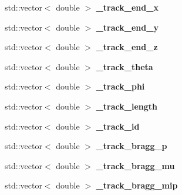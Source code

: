 \begin{DoxyCompactItemize}
\item 
\hypertarget{group__lee_ga78cb36dded5326c08cae77d5af6f3cd2}{std\-::vector$<$ double $>$ {\bfseries \-\_\-track\-\_\-end\-\_\-x}}\label{group__lee_ga78cb36dded5326c08cae77d5af6f3cd2}

\item 
\hypertarget{group__lee_ga55174718268fd53d080c224f60f96488}{std\-::vector$<$ double $>$ {\bfseries \-\_\-track\-\_\-end\-\_\-y}}\label{group__lee_ga55174718268fd53d080c224f60f96488}

\item 
\hypertarget{group__lee_ga147c8d113ee9fc316a7addd39e392d71}{std\-::vector$<$ double $>$ {\bfseries \-\_\-track\-\_\-end\-\_\-z}}\label{group__lee_ga147c8d113ee9fc316a7addd39e392d71}

\item 
\hypertarget{group__lee_ga320eaa4a60f4628c6320c5c721f2899c}{std\-::vector$<$ double $>$ {\bfseries \-\_\-track\-\_\-theta}}\label{group__lee_ga320eaa4a60f4628c6320c5c721f2899c}

\item 
\hypertarget{group__lee_gae045ae6a478b38e3d165ced855b610e4}{std\-::vector$<$ double $>$ {\bfseries \-\_\-track\-\_\-phi}}\label{group__lee_gae045ae6a478b38e3d165ced855b610e4}

\item 
\hypertarget{group__lee_ga801ed095fb9dfb752f424ea91107cffc}{std\-::vector$<$ double $>$ {\bfseries \-\_\-track\-\_\-length}}\label{group__lee_ga801ed095fb9dfb752f424ea91107cffc}

\item 
\hypertarget{group__lee_ga13a633d3b83e96b70adae044df973ec7}{std\-::vector$<$ double $>$ {\bfseries \-\_\-track\-\_\-id}}\label{group__lee_ga13a633d3b83e96b70adae044df973ec7}

\item 
\hypertarget{group__lee_ga4297d696c8a18a62866df4ae2af0115f}{std\-::vector$<$ double $>$ {\bfseries \-\_\-track\-\_\-bragg\-\_\-p}}\label{group__lee_ga4297d696c8a18a62866df4ae2af0115f}

\item 
\hypertarget{group__lee_ga26c2928e27efaef45a0bd73265732f61}{std\-::vector$<$ double $>$ {\bfseries \-\_\-track\-\_\-bragg\-\_\-mu}}\label{group__lee_ga26c2928e27efaef45a0bd73265732f61}

\item 
\hypertarget{group__lee_ga54899eb2a96c6b30e3aa350877ee396f}{std\-::vector$<$ double $>$ {\bfseries \-\_\-track\-\_\-bragg\-\_\-mip}}\label{group__lee_ga54899eb2a96c6b30e3aa350877ee396f}


\end{DoxyCompactItemize}
